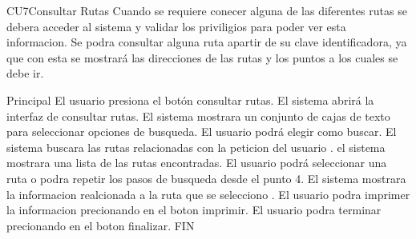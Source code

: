 \begin{UseCase}{CU7}{Consultar Rutas}{
	Cuando se requiere conecer alguna de las diferentes rutas se debera acceder al sistema y validar los priviligios para poder ver esta informacion.
	Se podra consultar alguna ruta apartir de su clave identificadora, ya que con esta se mostrará las direcciones de las rutas y los puntos a los cuales se debe ir.
}
	
\end{UseCase}

\begin{UCtrayectoria}{Principal}
	\UCpaso El usuario presiona el botón consultar rutas.
	\UCpaso	El sistema abrirá la interfaz de consultar rutas.
	\UCpaso	El sistema  mostrara un conjunto de cajas de texto para seleccionar opciones de busqueda.
	\UCpaso	El usuario podrá elegir como buscar.
	\UCpaso	El sistema buscara las rutas relacionadas con la peticion del usuario .
	\UCpaso	el sistema mostrara una lista de las rutas encontradas.
	\UCpaso	El usuario podrá seleccionar una ruta o podra repetir los pasos de busqueda desde el punto 4. 
	\UCpaso	El sistema mostrara la informacion realcionada a la ruta que se selecciono .
	\UCpaso El usuario podra imprimer la informacion precionando en el boton imprimir.
	\UCpaso	El usuario podra terminar precionando en el boton finalizar.
	\UCpaso	FIN
\end{UCtrayectoria}
	
